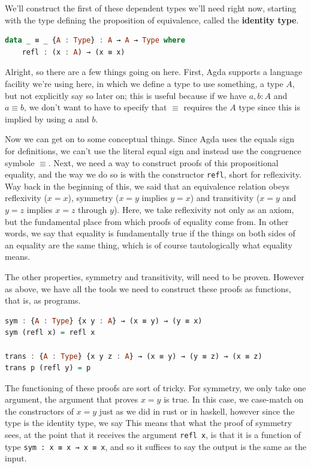 \documentclass[11pt]{article}
\begin{document}
We'll construct the first of these dependent types we'll need right now, starting with the type defining the proposition of equivalence, called the \textbf{identity type}. \begin{lstlisting}[language=Haskell]
data _ ≡ _ {A : Type} : A → A → Type where
	refl : (x : A) → (x ≡ x)
\end{lstlisting}

Alright, so there are a few things going on here. First, Agda supports a language facility we're using here, in which we define a type to use something, a type $A$, but not explicitly say so later on; this is useful because if we have $a,b \colon A$ and $a \equiv b$, we don't want to have to specify that $\equiv$ requires the $A$ type since this is implied by using $a$ and $b$.

Now we can get on to some conceptual things. Since Agda uses the equals sign for definitions, we can't use the literal equal sign and instead use the congruence symbole $\equiv$. Next, we need a way to construct proofs of this propositional equality, and the way we do so is with the constructor \texttt{refl}, short for reflexivity. Way back in the beginning of this, we said that an equivalence relation obeys reflexivity ($x = x$), symmetry ($x=y$ implies $y=x$) and transitivity ($x=y$ and $y=z$ implies $x=z$ through $y$). Here, we take reflexivity not only as an axiom, but the fundamental place from which proofs of equality come from. In other words, we say that equality is fundamentally true if the things on both sides of an equality are the same thing, which is of course tautologically what equality means.

The other properties, symmetry and transitivity, will need to be proven. However as above, we have all the tools we need to construct these proofs as functions, that is, as programs. \begin{lstlisting}[language=Haskell]
sym : {A : Type} {x y : A} → (x ≡ y) → (y ≡ x)
sym (refl x) = refl x

trans : {A : Type} {x y z : A} → (x ≡ y) → (y ≡ z) → (x ≡ z)
trans p (refl y) = p
\end{lstlisting}

The functioning of these proofs are sort of tricky. For symmetry, we only take one argument, the argument that proves $x = y$ is true. In this case, we case-match on the constructors of $x = y$ just as we did in rust or in haskell, however since the type is the identity type, we say  This means that what the proof of symmetry sees, at the point that it receives the argument \texttt{refl x}, is that it is a function of type \texttt{sym : x ≡ x → x ≡ x}, and so it suffices to say the output is the same as the input.
\end{document}
